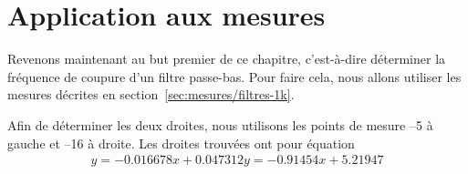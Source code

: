 \section{Application aux mesures}

Revenons maintenant au but premier de ce chapitre,
c'est-à-dire déterminer la fréquence de coupure d'un filtre passe-bas.
Pour faire cela, nous allons utiliser les mesures décrites en
section~\ref{sec:mesures/filtres-1k}.

Afin de déterminer les deux droites, nous utilisons les points de mesure
--5 à gauche et --16 à droite.
Les droites trouvées ont pour équation
\begin{equation}
    \begin{array}{rcl}
        y = -0.016678x+0.047312
        y = -0.91454x+5.21947
    \end{array}
\end{equation}
